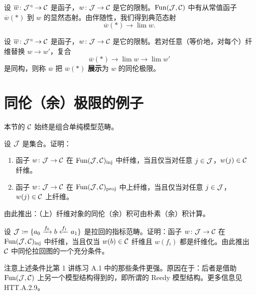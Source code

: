 \begin{construction}\label{L8-2.17}
设 $\overline{w}\colon \mathcal{J}^{\triangleleft}\to\mathcal{C}$ 是函子，$w\colon \mathcal{J}\to\mathcal{C}$ 是它的限制。$\operatorname{Fun}(\mathcal{J},\mathcal{C})$ 中有从常值函子 $\overline{w}(\ast)$ 到 $w$ 的显然态射。由伴随性，我们得到典范态射
\[
\overline{w}(\ast)\to \lim w.
\]
\end{construction}

\begin{definition}\label{L8-2.18}
设 $\overline{w}\colon \mathcal{J}^{\triangleleft}\to\mathcal{C}$ 是函子，$w\colon \mathcal{J}\to\mathcal{C}$ 是它的限制。若对任意（等价地，对每个）纤维替换 $w\to w'$，复合
\[
\overline{w}(\ast)\to \lim w\to \lim w'
\]
是同构，则称 $\overline{w}$ 把 $\overline{w}(\ast)$ \textbf{展示}为 $w$ 的同伦极限。
\end{definition}


\section{同伦（余）极限的例子}

\nitem\label{L8-3.1} 本节的 $\mathcal{C}$ 始终是组合单纯模型范畴。

\begin{exercise}\label{L8-3.2}
设 $\mathcal{J}$ 是集合。证明：
\begin{enumerate}[label=(\arabic*),leftmargin=2.4em,itemsep=0.1em]
\item 函子 $w\colon \mathcal{J}\to\mathcal{C}$ 在 $\operatorname{Fun}(\mathcal{J},\mathcal{C})_{\mathrm{inj}}$ 中纤维，当且仅当对任意 $j\in\mathcal{J}$，$w(j)\in\mathcal{C}$ 纤维。
\item 函子 $w\colon \mathcal{J}\to\mathcal{C}$ 在 $\operatorname{Fun}(\mathcal{J},\mathcal{C})_{\mathrm{proj}}$ 中上纤维，当且仅当对任意 $j\in\mathcal{J}$，$w(j)\in\mathcal{C}$ 上纤维。
\end{enumerate}
由此推出：（上）纤维对象的同伦（余）积可由朴素（余）积计算。
\end{exercise}

\begin{exercise}\label{L8-3.3}
设 $\mathcal{J}\coloneqq \{a_0\xrightarrow{f_0} b\xleftarrow{f_1} a_1\}$ 是拉回的指标范畴。证明：函子 $w\colon \mathcal{J}\to\mathcal{C}$ 在 $\operatorname{Fun}(\mathcal{J},\mathcal{C})_{\mathrm{inj}}$ 中纤维，当且仅当 $w(b)\in\mathcal{C}$ 纤维且 $w(f_i)$ 都是纤维化。由此推出 $\mathcal{C}$ 中同伦拉回图的一个充分条件。
\end{exercise}

\begin{remark}\label{L8-3.4}
注意上述条件比第 1 讲练习 A.1 中的那些条件更强。原因在于：后者是借助 $\operatorname{Fun}(\mathcal{J},\mathcal{C})$ 上另一个模型结构得到的，即所谓的 Reedy 模型结构。更多信息见 HTT.A.2.9。
\end{remark}


